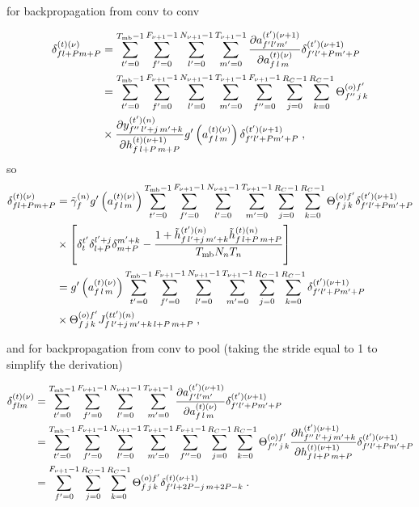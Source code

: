 \begin{subappendices}
for backpropagation from conv to conv

\begin{align}
\delta^{(t)(\nu)}_{fl+Pm+P}&=
%
\sum_{t'=0}^{T_{{\rm mb}}-1}\sum^{F_{\nu+1}-1}_{f'=0}\sum^{N_{\nu+1}-1}_{l'=0}\sum^{T_{\nu+1}-1}_{m'=0}
%
\frac{\partial a_{f'l'm'}^{(t')(\nu+1)}}{\partial a_{f\,l\,m}^{(t)(\nu)}}
%
\delta_{f'l'+Pm'+P}^{(t')(\nu+1)}\notag\\
%
&=\sum_{t'=0}^{T_{{\rm mb}}-1}\sum^{F_{\nu+1}-1}_{f'=0}\sum^{N_{\nu+1}-1}_{l'=0}\sum^{T_{\nu+1}-1}_{m'=0}
%
\sum^{F_{\nu+1}-1}_{f''=0}\sum^{R_C-1}_{j=0}\sum^{R_C-1}_{k=0}
%
\Theta^{(o)f'}_{f''\,j\,k}\notag\\
%
&\times\frac{\partial  y^{(t')(n)}_{f''\,l'+j\,m'+k}}{\partial h_{f\,l+P\,m+P}^{(t)(\nu+1)}}
%
g'\left(a_{f\,l\,m}^{(t)(\nu)}\right)\delta_{f'l'+Pm'+P}^{(t')(\nu+1)}\;,
\end{align}
so
\begin{align}
\delta^{(t)(\nu)}_{fl+Pm+P}&=\tilde{\gamma}^{(n)}_fg'\left(a_{f\,l\,m}^{(t)(\nu)}\right)
%
\sum_{t'=0}^{T_{{\rm mb}}-1}\sum^{F_{\nu+1}-1}_{f'=0}\sum^{N_{\nu+1}-1}_{l'=0}\sum^{T_{\nu+1}-1}_{m'=0}
%
\sum^{R_C-1}_{j=0}\sum^{R_C-1}_{k=0}\Theta^{(o)f'}_{f\,j\,k}\delta_{f'l'+Pm'+P}^{(t')(\nu+1)}\notag\\
%
&\times \left[\delta^{t'}_t\delta^{ l'+j}_{l+P}\delta^{m'+k}_{m+P}-
%
\frac{1+\tilde{h}_{f\, l'+j\,m'+k}^{(t')(n)}\tilde{h}_{f\,l+P\,m+P}^{(t)(n)}}{T_{{\rm mb}}N_nT_n}\right]\notag\\
%
&=g'\left(a_{f\,l\,m}^{(t)(\nu)}\right)
%
\sum_{t'=0}^{T_{{\rm mb}}-1}\sum^{F_{\nu+1}-1}_{f'=0}\sum^{N_{\nu+1}-1}_{l'=0}\sum^{T_{\nu+1}-1}_{m'=0}
%
\sum^{R_C-1}_{j=0}\sum^{R_C-1}_{k=0}\delta_{f'l'+Pm'+P}^{(t')(\nu+1)}\notag\\
%
&\times \Theta^{(o)f'}_{f\,j\,k} J^{(tt')(n)}_{f\, l'+j\,m'+k\,l+P\,m+P}\;,
\end{align}

and for backpropagation from conv to pool (taking the stride equal to 1 to simplify the derivation)

\begin{align}
\delta^{(t)(\nu)}_{flm}&=
%
\sum_{t'=0}^{T_{{\rm mb}}-1}\sum^{F_{\nu+1}-1}_{f'=0}\sum^{N_{\nu+1}-1}_{l'=0}\sum^{T_{\nu+1}-1}_{m'=0}
%
\frac{\partial a_{f'l'm'}^{(t')(\nu+1)}}{\partial a_{f\,l\,m}^{(t)(\nu)}}
%
\delta_{f'l'+Pm'+P}^{(t')(\nu+1)}\notag\\
%
&=\sum_{t'=0}^{T_{{\rm mb}}-1}\sum^{F_{\nu+1}-1}_{f'=0}\sum^{N_{\nu+1}-1}_{l'=0}\sum^{T_{\nu+1}-1}_{m'=0}
%
\sum^{F_{\nu+1}-1}_{f''=0}\sum^{R_C-1}_{j=0}\sum^{R_C-1}_{k=0}
%
\Theta^{(o)f'}_{f''\,j\,k}
%
\frac{\partial  h^{(t')(\nu+1)}_{f''\,l'+j\,m'+k}}{\partial h_{f\,l+P\,m+P}^{(t)(\nu+1)}}
%
\delta_{f'l'+Pm'+P}^{(t')(\nu+1)}\notag\\
%
&=\sum^{F_{\nu+1}-1}_{f'=0}\sum^{R_C-1}_{j=0}\sum^{R_C-1}_{k=0}
%
\Theta^{(o)f'}_{f\,j\,k}\delta_{f'l+2P-j\,m+2P-k}^{(t)(\nu+1)}\;.
\end{align}


\end{subappendices}
